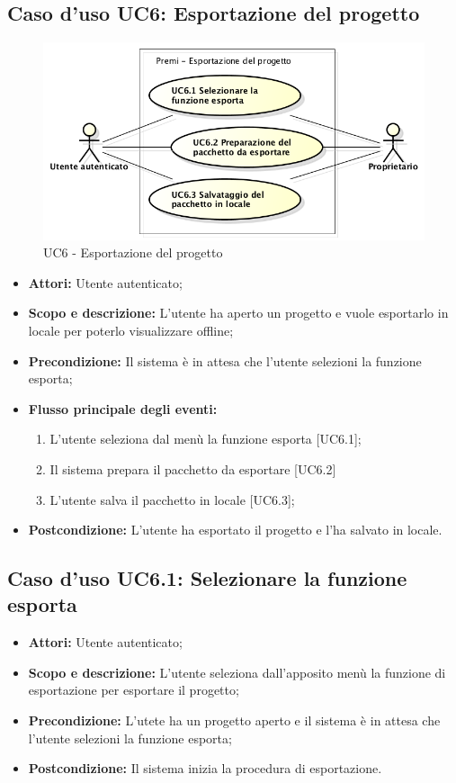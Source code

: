 \subsection{Caso d'uso UC6: Esportazione del progetto}
	\begin{figure}[h]
		\centering
		\includegraphics[scale=0.45] {img/UC6.png}
		\caption{UC6 - Esportazione del progetto}
	\end{figure}

	\begin{itemize}
		\item \textbf{Attori:} Utente autenticato;
		\item \textbf{Scopo e descrizione:} L'utente ha aperto un progetto e vuole esportarlo in locale per poterlo visualizzare offline;
		\item \textbf{Precondizione:} Il sistema è in attesa che l'utente selezioni la funzione esporta;
		\item \textbf{Flusso principale degli eventi:}
		\begin{enumerate}
			\item L'utente seleziona dal menù la funzione esporta [UC6.1];
			\item Il sistema prepara il pacchetto da esportare [UC6.2]
			\item L'utente salva il pacchetto in locale [UC6.3];
		\end{enumerate}
		\item \textbf{Postcondizione:} L'utente ha esportato il progetto e l'ha salvato in locale.
	\end{itemize}


\subsection{Caso d'uso UC6.1: Selezionare la funzione esporta}
	\begin{itemize}
		\item \textbf{Attori:} Utente autenticato;
		\item \textbf{Scopo e descrizione:} L'utente seleziona dall'apposito menù la funzione di esportazione per esportare il progetto;
		\item \textbf{Precondizione:} L'utete ha un progetto aperto e il sistema è in attesa che l'utente selezioni la funzione esporta;
		\item \textbf{Postcondizione:} Il sistema inizia la procedura di esportazione.
	\end{itemize}


